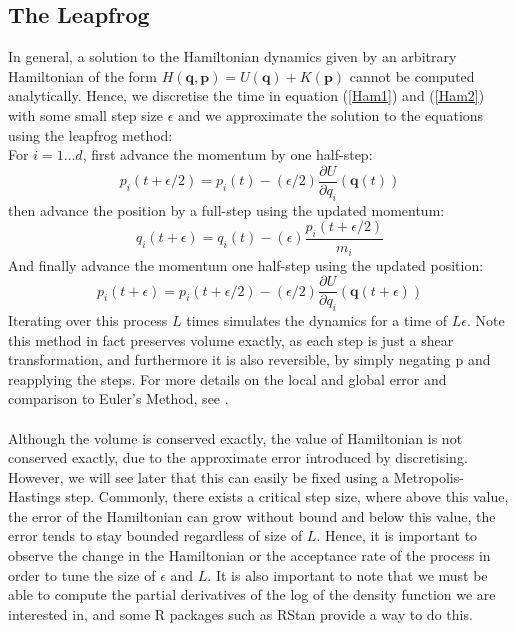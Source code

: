 \documentclass[11pt]{article}
\begin{document}
\subsection{The Leapfrog}
In general, a solution to the Hamiltonian dynamics given by an arbitrary Hamiltonian of the form $H(\mathbf{q},\mathbf{p}) = U(\mathbf{q}) + K(\mathbf{p})$ cannot be computed analytically. Hence, we discretise the time in equation (\ref{Ham1}) and (\ref{Ham2}) with some small step size $\epsilon$ and we approximate the solution to the equations using the leapfrog method:
\\ For $i=1\dots d$, first advance the momentum by one half-step:
\begin{equation}
p_{i}(t+\epsilon/2) = p_{i}(t) - (\epsilon/2)\frac{\partial U}{\partial q_{i}}(\mathbf{q}(t))
\end{equation}
then advance the position by a full-step using the updated momentum:
\begin{equation}
q_{i}(t+\epsilon) = q_{i}(t) - (\epsilon)\frac{p_{i}(t+\epsilon/2)}{m_{i}}
\end{equation}
And finally advance the momentum one half-step using the updated position:
\begin{equation}
p_{i}(t+\epsilon) = p_{i}(t+\epsilon/2) - (\epsilon/2)\frac{\partial U}{\partial q_{i}}(\mathbf{q}(t+\epsilon))
\end{equation}
Iterating over this process $L$ times simulates the dynamics for a time of $L\epsilon$.
Note this method in fact preserves volume exactly, as each step is just a shear transformation, and furthermore it is also reversible, by simply negating p and reapplying the steps. For more details on the local and global error and comparison to Euler's Method, see \cite{neal}.
\\
\\
Although the volume is conserved exactly, the value of Hamiltonian is not conserved exactly, due to the approximate error introduced by discretising. However, we will see later that this can easily be fixed using a Metropolis-Hastings step. Commonly, there exists a critical step size, where above this value, the error of the Hamiltonian can grow without bound and below this value, the error tends to stay bounded regardless of size of $L$. Hence, it is important to observe the change in the Hamiltonian or the acceptance rate of the process in order to tune the size of $\epsilon$ and $L$. It is also important to note that we must be able to compute the partial derivatives of the log of the density function we are interested in, and some R packages such as RStan\cite{rstan} provide a way to do this.
\end{document}
